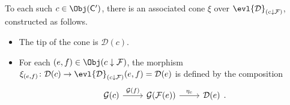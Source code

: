 \documentclass[notes.tex]{subfiles}
\begin{document}
To each such $c \in \Obj(\mathsf{C}')$, there is an associated cone $\xi$ over $\evl{\mathcal{D}}_{(c \downarrow \mathcal{F})}$, constructed as follows.

\begin{itemize}
  \item The tip of the cone is $\mathcal{D}(c)$.

  \item For each $(e, f) \in \Obj(c \downarrow \mathcal{F})$, the morphism $\xi_{(e, f)}\colon\mathcal{D}(c) \to \evl{\mathcal{D}}_{(c \downarrow \mathcal{F})}(e, f) = \mathcal{D}(e)$ is defined by the composition
    \begin{equation*}
      \begin{tikzcd}
        \mathcal{G}(c)
        \arrow[r, "\mathcal{G}(f)"]
        & \mathcal{G}(\mathcal{F}(e))
        \arrow[r, "\eta_{e}"]
        & \mathcal{D}(e)
      \end{tikzcd}.
    \end{equation*}
\end{itemize}
\end{document}
